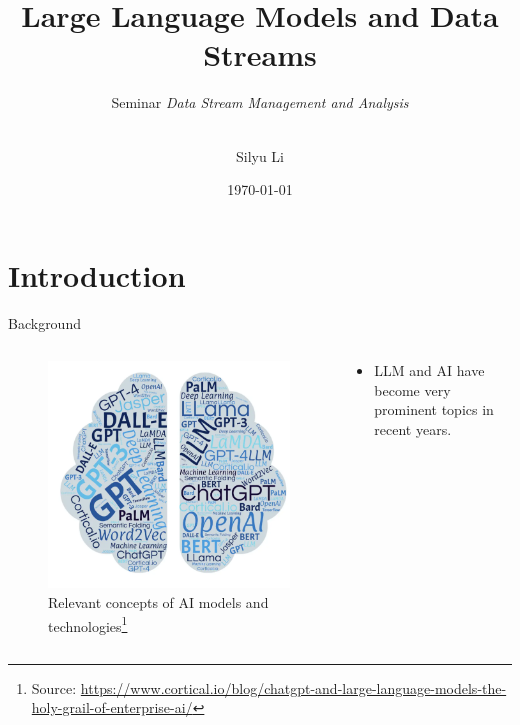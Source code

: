 \documentclass[t]{beamer}
\title{Large Language Models and Data Streams}
\subtitle{
  Seminar \textsl{Data Stream Management and Analysis}\\[1ex]
  \insertdate\\[1ex]
  \insertauthor
}
\date{\today}
\author{Silyu Li}
\institute{RWTH Aachen University}
\begin{document}
\begin{frame}[plain]
  \titlepage
\end{frame}


\section{Introduction}
\begin{frame}{Background}
  \begin{columns}
    \begin{column}{0.4\textwidth}
        \begin{figure}
            \centering
            \includegraphics[width=\textwidth]{llm1.png}
            \caption{Relevant concepts of AI models and technologies\footnote{Source: \url{https://www.cortical.io/blog/chatgpt-and-large-language-models-the-holy-grail-of-enterprise-ai/}}}
            \label{fig:llm1}
        \end{figure}
    \end{column}
    \begin{column}{0.5\textwidth}
        \begin{itemize}
            \item LLM and AI have become very prominent topics in recent years.
        \end{itemize}
    \end{column}
\end{columns}
\end{frame}
\end{document}
